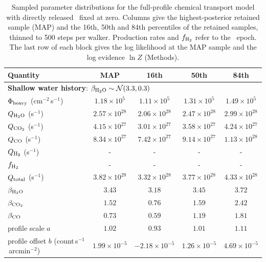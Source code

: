 \begin{table}[!ht]
\centering
\color{blue}
\singlespacing
\footnotesize

\setlength{\tabcolsep}{8pt}
\caption{Sampled parameter distributions for the full-profile chemical transport model with directly released \Htwo\ fixed at zero. Columns give the highest-posterior retained sample (MAP) and the 16th, 50th and 84th percentiles of the retained samples, thinned to 500 steps per walker. Production rates and $f_{\rm H_2}$ refer to the \xmm\ epoch. The last row of each block gives the log likelihood at the MAP sample and the log evidence $\ln Z$ (Methods).}
\begin{tabular}{@{}lcccc@{}}
\toprule
Quantity & MAP & 16th & 50th & 84th\\
\midrule
\multicolumn{5}{l}{\textbf{Shallow water history}: \(\beta_{\rm H_2O}\sim\mathcal N(3.3,0.3)\)}\\
\midrule
\(\Phi_{\rm heavy}\) (cm\(^{-2}\)\,s\(^{-1}\)) & \(1.18\times10^{5}\) & \(1.11\times10^{5}\) & \(1.31\times10^{5}\) & \(1.49\times10^{5}\)\\
\(Q_{\rm H_2O}\) (s\(^{-1}\)) & \(2.57\times10^{28}\) & \(2.06\times10^{28}\) & \(2.47\times10^{28}\) & \(2.99\times10^{28}\)\\
\(Q_{\rm CO_2}\) (s\(^{-1}\)) & \(4.15\times10^{27}\) & \(3.01\times10^{27}\) & \(3.58\times10^{27}\) & \(4.24\times10^{27}\)\\
\(Q_{\rm CO}\) (s\(^{-1}\)) & \(8.34\times10^{27}\) & \(7.42\times10^{27}\) & \(9.14\times10^{27}\) & \(1.13\times10^{28}\)\\
\(Q_{\rm H_2}\) (s\(^{-1}\)) & - & - & - & -\\
\(f_{\rm H_2}\) & - & - & - & -\\
\(Q_{\rm total}\) (s\(^{-1}\)) & \(3.82\times10^{28}\) & \(3.32\times10^{28}\) & \(3.77\times10^{28}\) & \(4.33\times10^{28}\)\\
\(\beta_{\rm H_2O}\) & \(3.43\) & \(3.18\) & \(3.45\) & \(3.72\)\\
\(\beta_{\rm CO_2}\) & \(1.52\) & \(0.76\) & \(1.59\) & \(2.42\)\\
\(\beta_{\rm CO}\) & \(0.73\) & \(0.59\) & \(1.19\) & \(1.81\)\\
\addlinespace[3pt]
profile scale $a$ & \(1.02\) & \(0.93\) & \(1.01\) & \(1.11\)\\
profile offset $b$ (count\,s\(^{-1}\)\,arcmin\(^{-2}\)) & \(1.99\times10^{-5}\) & \(-2.18\times10^{-5}\) & \(1.26\times10^{-5}\) & \(4.69\times10^{-5}\)\\

\end{tabular}
\end{table}
